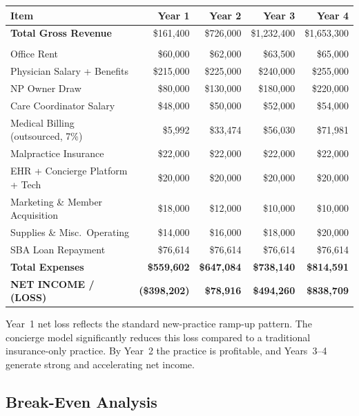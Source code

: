 \documentclass[11pt,letterpaper]{article}
\newcommand{\thead}[1]{\cellcolor{navy}\color{white}\bfseries\small #1}
\newcommand{\theadsub}[1]{\cellcolor{midblueh}\color{white}\bfseries\small #1}
\newcommand{\trow}{\rowcolor{rowshade}}
\newcommand{\ttotalrow}{\rowcolor{totalrow}}
\begin{document}
\vspace{6pt}
\begin{tabularx}{\linewidth}{|>{\small}X|>{\small}r|>{\small}r|>{\small}r|>{\small}r|}
\hline
\thead{Item} & \thead{Year 1} & \thead{Year 2} & \thead{Year 3} & \thead{Year 4} \\
\hline
\trow \textbf{Total Gross Revenue} & \$161,400 & \$726,000 & \$1,232,400 & \$1,653,300 \\
\hline
\multicolumn{5}{|l|}{\theadsub{OPERATING EXPENSES}} \\
\hline
Office Rent & \$60,000 & \$62,000 & \$63,500 & \$65,000 \\
\trow Physician Salary + Benefits & \$215,000 & \$225,000 & \$240,000 & \$255,000 \\
NP Owner Draw & \$80,000 & \$130,000 & \$180,000 & \$220,000 \\
\trow Care Coordinator Salary & \$48,000 & \$50,000 & \$52,000 & \$54,000 \\
Medical Billing (outsourced, 7\%) & \$5,992 & \$33,474 & \$56,030 & \$71,981 \\
\trow Malpractice Insurance & \$22,000 & \$22,000 & \$22,000 & \$22,000 \\
EHR + Concierge Platform + Tech & \$20,000 & \$20,000 & \$20,000 & \$20,000 \\
\trow Marketing \& Member Acquisition & \$18,000 & \$12,000 & \$10,000 & \$10,000 \\
Supplies \& Misc.\ Operating & \$14,000 & \$16,000 & \$18,000 & \$20,000 \\
\trow SBA Loan Repayment & \$76,614 & \$76,614 & \$76,614 & \$76,614 \\
\hline
\ttotalrow \textbf{Total Expenses} & \textbf{\$559,602} & \textbf{\$647,084} & \textbf{\$738,140} & \textbf{\$814,591} \\
\hline
\ttotalrow \textbf{NET INCOME / (LOSS)} & \textbf{(\$398,202)} & \textbf{\$78,916} & \textbf{\$494,260} & \textbf{\$838,709} \\
\hline
\end{tabularx}

\medskip
Year~1 net loss reflects the standard new-practice ramp-up pattern. The concierge model significantly reduces this loss compared to a traditional insurance-only practice. By Year~2 the practice is profitable, and Years~3--4 generate strong and accelerating net income.

\subsection{Break-Even Analysis}
\end{document}
